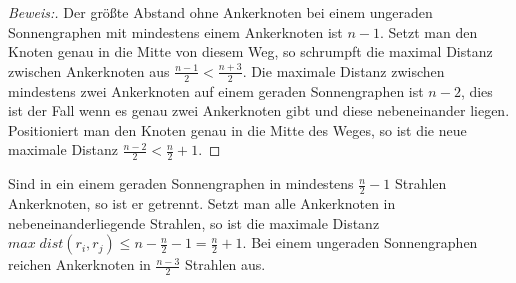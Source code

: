 \begin{proof}[Beweis:]
Der größte Abstand ohne Ankerknoten bei einem ungeraden Sonnengraphen mit mindestens einem Ankerknoten ist $n-1$. Setzt man den Knoten genau in die Mitte von diesem Weg, so schrumpft die maximal Distanz zwischen Ankerknoten aus $\frac{n-1}{2}<\frac{n+3}{2}$.\newline\newline
Die maximale Distanz zwischen mindestens zwei Ankerknoten auf einem geraden Sonnengraphen ist $n-2$, dies ist der Fall wenn es genau zwei Ankerknoten gibt und diese nebeneinander liegen. Positioniert man den Knoten genau in die Mitte des Weges, so ist die neue maximale Distanz $\frac{n-2}{2}<\frac{n}{2}+1$.
\end{proof}
\begin{folg}
Sind in ein einem geraden Sonnengraphen in mindestens $\frac{n}{2}-1$ Strahlen Ankerknoten, so ist er getrennt. Setzt man alle Ankerknoten in nebeneinanderliegende Strahlen, so ist die maximale Distanz $max\;dist(r_i,r_j) \leq n-\frac{n}{2}-1=\frac{n}{2}+1$. Bei einem ungeraden Sonnengraphen reichen Ankerknoten in $\frac{n-3}{2}$ Strahlen aus.
\end{folg}
